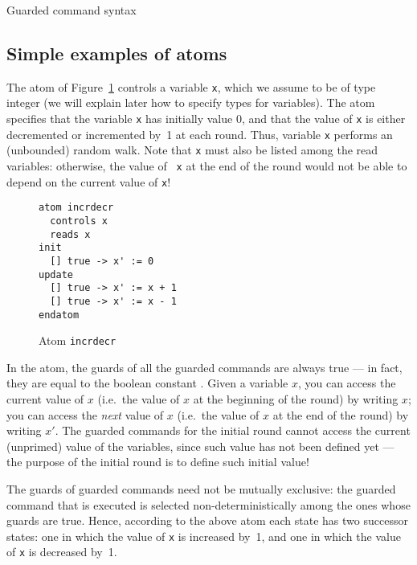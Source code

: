 \begin{table}
\caption{Guarded command syntax}
\label{table-gcommand-syntax}
\end{table}


\subsection{Simple examples of atoms}


The atom of Figure~\ref{fig-atomsimple} controls a variable {\tt x},
which we assume to be of type integer (we will explain later how to
specify types for variables).  The atom specifies that the variable
{\tt x} has initially value $0$, and that the value of {\tt x} is
either decremented or incremented by~1 at each round.  Thus, variable
{\tt x} performs an (unbounded) random walk.  Note that {\tt x} must
also be listed among the read variables: otherwise, the value of {\tt
x} at the end of the round would not be able to depend on the current
value of {\tt x}!

\begin{figure}
\begin{verbatim}
atom incrdecr
  controls x
  reads x
init
  [] true -> x' := 0
update 
  [] true -> x' := x + 1
  [] true -> x' := x - 1
endatom
\end{verbatim}
\caption{Atom {\tt incrdecr}}
\label{fig-atomsimple}
\end{figure}

In the atom, the guards of all the guarded commands are always true
--- in fact, they are equal to the boolean constant \TRUE.  Given a
variable $x$, you can access the current value of $x$ (i.e.\ the value
of $x$ at the beginning of the round) by writing $x$; you can access
the {\em next\/} value of $x$ (i.e.\ the value of $x$ at the end of
the round) by writing $x'$.  The guarded commands for the initial
round\index{round!initial} cannot access the current (unprimed) value
of the variables, since such value has not been defined yet --- the
purpose of the initial round is to define such initial value!

The guards of guarded commands need not be mutually exclusive: the
guarded command that is executed is selected non-deterministically
among the ones whose guards are true.  Hence, according to the above
atom each state has two successor states: one in which the value of
{\tt x} is increased by~1, and one in which the value of {\tt x} is
decreased by~1.

